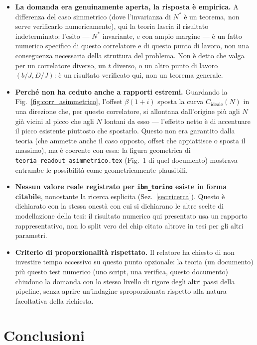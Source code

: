 \documentclass[11pt,a4paper]{article}
\begin{document}
\begin{itemize}[leftmargin=1.3em,itemsep=0.35em]
\item \textbf{La domanda era genuinamente aperta, la risposta è
empirica.} A differenza del caso simmetrico (dove l'invarianza di $N^*$ è
un teorema, non serve verificarlo numericamente), qui la teoria lascia
il risultato indeterminato: l'esito --- $N^*$ invariante, e con ampio
margine --- è un fatto numerico specifico di questo correlatore e di
questo punto di lavoro, non una conseguenza necessaria della struttura
del problema. Non è detto che valga per un correlatore diverso, un $t$
diverso, o un altro punto di lavoro $(b/J,D/J)$: è un risultato verificato
qui, non un teorema generale.

\item \textbf{Perché non ha ceduto anche a rapporti estremi.} Guardando
la Fig.~\ref{fig:corr_asimmetrico}, l'offset $\beta(1+i)$ sposta la curva
$C_\text{ideale}(N)$ in una direzione che, per questo correlatore, si
allontana dall'origine più agli $N$ già vicini al picco che agli $N$
lontani da esso --- l'effetto netto è di accentuare il picco esistente
piuttosto che spostarlo. Questo non era garantito dalla teoria (che
ammette anche il caso opposto, offset che appiattisce o sposta il
massimo), ma è coerente con essa: la figura geometrica di
\texttt{teoria\_readout\_asimmetrico.tex} (Fig.~1 di quel documento)
mostrava entrambe le possibilità come geometricamente plausibili.

\item \textbf{Nessun valore reale registrato per \texttt{ibm\_torino}
esiste in forma citabile}, nonostante la ricerca esplicita
(Sez.~\ref{sec:ricerca}). Questo è dichiarato con la stessa onestà con cui
si dichiarano le altre scelte di modellazione della tesi: il risultato
numerico qui presentato usa un rapporto rappresentativo, non lo split
vero del chip citato altrove in tesi per gli altri parametri.

\item \textbf{Criterio di proporzionalità rispettato.} Il relatore ha
chiesto di non investire tempo eccessivo su questo punto opzionale: la
teoria (un documento) più questo test numerico (uno script, una verifica,
questo documento) chiudono la domanda con lo stesso livello di rigore
degli altri passi della pipeline, senza aprire un'indagine sproporzionata
rispetto alla natura facoltativa della richiesta.
\end{itemize}

\section{Conclusioni}
\end{document}
